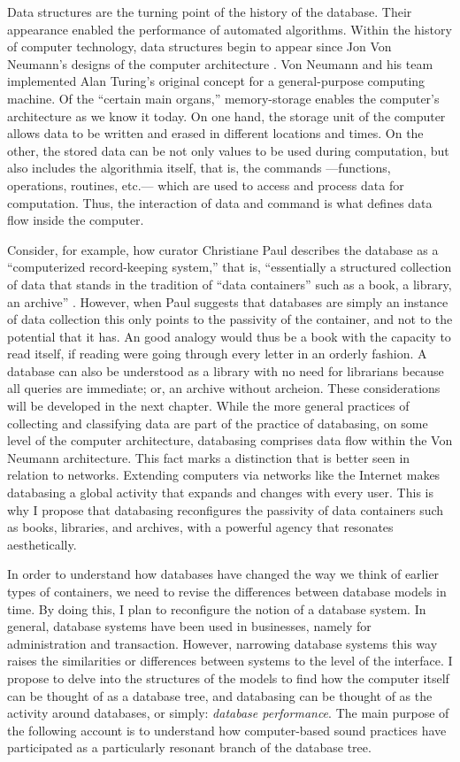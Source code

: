 Data structures are the turning point of the history of the database. Their appearance enabled the performance of automated algorithms. Within the history of computer technology, data structures begin to appear since Jon Von Neumann's designs of the computer architecture \parencite{von46:Pre}. Von Neumann and his team implemented Alan Turing's original concept for a general-purpose computing machine. Of the ``certain main organs,'' memory-storage enables the computer's architecture as we know it today. On one hand, the storage unit of the computer allows data to be written and erased in different locations and times. On the other, the stored data can be not only values to be used during computation, but also includes the algorithmia itself, that is, the commands ---functions, operations, routines, etc.--- which are used to access and process data for computation. Thus, the interaction of data and command is what defines data flow inside the computer.

Consider, for example, how curator Christiane Paul describes the database as a ``computerized record-keeping system,'' that is, ``essentially a structured collection of data that stands in the tradition of ``data containers'' such as a book, a library, an archive'' \parencite[95]{Pau07:The}. However, when Paul suggests that databases are simply an instance of data collection this only points to the passivity of the container, and not to the potential that it has. An good analogy would thus be a book with the capacity to read itself, if reading were going through every letter in an orderly fashion. A database can also be understood as a library with no need for librarians because all queries are immediate; or, an archive without archeion. These considerations will be developed in the next chapter. While the more general practices of collecting and classifying data are part of the practice of databasing, on some level of the computer architecture, databasing comprises data flow within the Von Neumann architecture. This fact marks a distinction that is better seen in relation to networks. Extending computers via networks like the Internet makes databasing a global activity that expands and changes with every user. This is why I propose that databasing reconfigures the passivity of data containers such as books, libraries, and archives, with a powerful agency that resonates aesthetically.

In order to understand how databases have changed the way we think of earlier types of containers, we need to revise the differences between database models in time. By doing this, I plan to reconfigure the notion of a database system. In general, database systems have been used in businesses, namely for administration and transaction. However, narrowing database systems this way raises the similarities or differences between systems to the level of the interface. I propose to delve into the structures of the models to find how the computer itself can be thought of as a database tree, and databasing can be thought of as the activity around databases, or simply: \textit{database performance}. The main purpose of the following account is to understand how computer-based sound practices have participated as a particularly resonant branch of the database tree.

